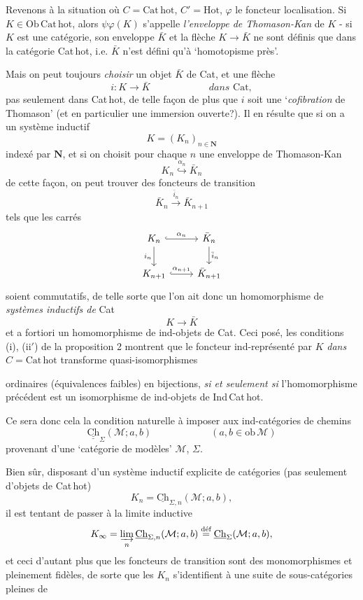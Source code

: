 \documentclass[11pt]{article}
\newcommand{\printedpage}[1]{\marginpar{\footnotesize p.~#1}}
\newcommand{\msp}[1]{\marginpar{\footnotesize [#1]}}
\newcommand{\Hot}{\mathrm{Hot}}
\newcommand{\Ob}{\mathrm{Ob}\,}
\newcommand{\Ch}{\underline{\mathrm{Ch}}}
\newcommand{\Chh}{\underline{\underline{\mathrm{Ch}}}}
\newcommand{\Cathot}{\mathrm{Cat\,hot}}
\newcommand{\Cat}{\mathrm{Cat}}
\begin{document}
Revenons à la situation où $C = \Cathot$, $C' = \Hot$, $\varphi$ le foncteur localisation. Si $K \in \Ob\Cathot$, alors $\psi\varphi(K)$ s'appelle \textit{l'enveloppe de Thomason-Kan} de $K$ - si $K$ est une catégorie, son enveloppe $\bar{K}$ et la flèche $K \longrightarrow \bar{K}$ ne sont définis que dans la catégorie Cat\,hot, i.e. $\bar{K}$ n'est défini qu'à `homotopisme près'. %

\noindent\msp{page 43}%
Mais on peut toujours \textit{choisir} un objet $\bar{K}$ de Cat, et une flèche
\[
i : K \longrightarrow \bar{K} \qquad\qquad\qquad \textit{dans } \Cat,
\]
\printedpage{28}
pas seulement dans Cat\,hot, de telle façon de plus que $i$ soit une `\textit{cofibration} de Thomason' (et en particulier une immersion ouverte?). Il en résulte que si on a un système inductif
\[
K = (K_n)_{n\in\mathbf{N}}
\]
indexé par $\mathbf{N}$, et si on choisit pour chaque $n$ une enveloppe de Thomason-Kan
\[
K_n \overset{\alpha_n}{\hookrightarrow} \bar{K}_n
\]
de cette façon, on peut trouver des foncteurs de transition
\[
\bar{K}_n \xrightarrow{\bar{i}_n} \bar{K}_{n+1}
\]
tels que les carrés
\[
\begin{tikzcd}
K_n \arrow[r,hook,"\alpha_n"] \arrow[d,"i_n"'] & \bar{K}_n \arrow[d,"\bar{i}_n"] \\
K_{n+1} \arrow[r,hook,"\alpha_{n+1}"] & \bar{K}_{n+1}
\end{tikzcd}
\]
soient commutatifs, de telle sorte que l'on ait donc un homomorphisme de \textit{systèmes inductifs de} Cat
\[
K \longrightarrow \bar{K}
\]
et a fortiori un homomorphisme de ind-objets de Cat. Ceci posé, les conditions (i), (ii$'$) de la proposition 2 montrent que le foncteur ind-représenté par $K$ \textit{dans} $C = \Cathot$ transforme quasi-isomorphismes

\noindent\msp{page 44}%
ordinaires (équivalences faibles) en bijections, \textit{si et seulement si} l'homomorphisme précédent est un isomorphisme de ind-objets de Ind\,Cat\,hot.

Ce sera donc cela la condition naturelle à imposer aux ind-catégories de chemins
\[
\Chh_{\Sigma}(\mathcal{M};a,b) \qquad\qquad\qquad (a,b \in \mathrm{ob}\,\mathcal{M})
\]
provenant d'une `catégorie de modèles' $\mathcal{M}$, $\Sigma$.

Bien sûr, disposant d'un système inductif explicite de catégories (pas seulement d'objets de Cat\,hot)
\[
K_n = \Ch_{\Sigma,n}(\mathcal{M};a,b),
\]
il est tentant de passer à la limite inductive
\[
K_\infty = \varinjlim_n \Ch_{\Sigma,n}(\mathcal{M};a,b) \overset{\text{déf}}{=} \Ch_{\Sigma}(\mathcal{M};a,b),
\]
et ceci d'autant plus que les foncteurs de transition sont des monomorphismes et pleinement fidèles, de sorte que les $K_n$ s'identifient à une suite de sous-catégories pleines de
\end{document}
